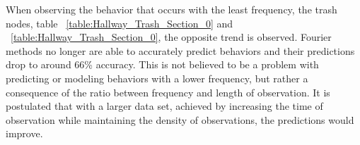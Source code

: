 \begin{table}[h!]
  \centering
  \caption{Hallway Meal Section 1}
  \label{table:Hallway_Meal_Section_1}
\end{table}


When observing the behavior that occurs with the least frequency, the trash
nodes, table ~\ref{table:Hallway_Trash_Section_0} and ~\ref{table:Hallway_Trash_Section_0},
the opposite trend is observed. Fourier methods no longer are able to
accurately predict behaviors and their predictions drop to around 66\% accuracy.
This is not believed to be a problem with predicting or modeling behaviors with a
lower frequency, but rather a consequence of the ratio between frequency and
length of observation. It is postulated that
with a larger data set, achieved by increasing the time of observation while
maintaining the density of observations, the predictions would improve. \\

